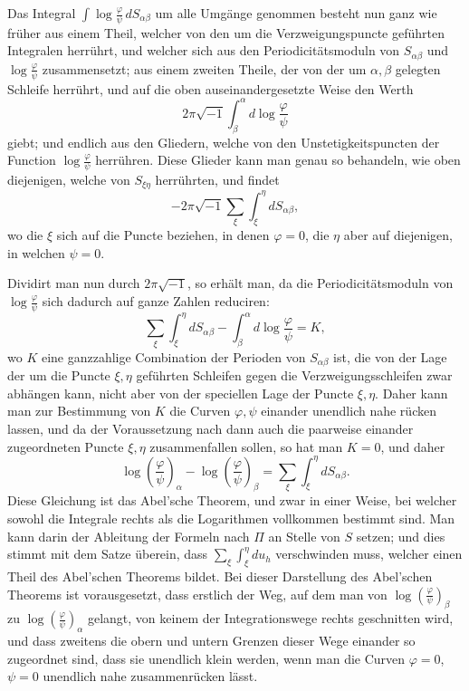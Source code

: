 \documentclass[10pt]{article}
\begin{document}
Das Integral \(\int\log\frac{\varphi}{\psi}\,dS_{\alpha\beta}\) um alle Umgänge genommen besteht nun ganz wie früher aus einem Theil, welcher von den um die Verzweigungspuncte geführten Integralen herrührt, und welcher sich aus den Periodicitätsmoduln von \(S_{\alpha\beta}\) und \(\log\frac{\varphi}{\psi}\) zusammensetzt; aus einem zweiten Theile, der von der um \(\alpha,\beta\) gelegten Schleife herrührt, und auf die oben auseinandergesetzte Weise den Werth
\[
2\pi\sqrt{-1}\int_{\beta}^{\alpha}d\log\frac{\varphi}{\psi}
\]
giebt; und endlich aus den Gliedern, welche von den Unstetigkeitspuncten der Function \(\log\frac{\varphi}{\psi}\) herrühren. Diese Glieder kann man genau so behandeln, wie oben diejenigen, welche von \(S_{\xi\eta}\) herrührten, und findet
\[
-2\pi\sqrt{-1}\sum_{\xi}\int_{\xi}^{\eta}dS_{\alpha\beta},
\]
wo die \(\xi\) sich auf die Puncte beziehen, in denen \(\varphi=0\), die \(\eta\) aber auf diejenigen, in welchen \(\psi=0\).

Dividirt man nun durch \(2\pi\sqrt{-1}\), so erhält man, da die Periodicitätsmoduln von \(\log\frac{\varphi}{\psi}\) sich dadurch auf ganze Zahlen reduciren:
\[
\sum_{\xi}\int_{\xi}^{\eta}dS_{\alpha\beta}-\int_{\beta}^{\alpha}d\log\frac{\varphi}{\psi}=K,
\]
wo \(K\) eine ganzzahlige Combination der Perioden von \(S_{\alpha\beta}\) ist, die von der Lage der um die Puncte \(\xi,\eta\) geführten Schleifen gegen die Verzweigungsschleifen zwar abhängen kann, nicht aber von der speciellen Lage der Puncte \(\xi,\eta\). Daher kann man zur Bestimmung von \(K\) die Curven \(\varphi,\psi\) einander unendlich nahe rücken lassen, und da der Voraussetzung nach dann auch die paarweise einander zugeordneten Puncte \(\xi,\eta\) zusammenfallen sollen, so hat man \(K=0\), und daher
\[
\log\left(\frac{\varphi}{\psi}\right)_\alpha-\log\left(\frac{\varphi}{\psi}\right)_\beta
=\sum_{\xi}\int_{\xi}^{\eta}dS_{\alpha\beta}.
\]
Diese Gleichung ist das Abel'sche Theorem, und zwar in einer Weise, bei welcher sowohl die Integrale rechts als die Logarithmen vollkommen bestimmt sind. Man kann darin der Ableitung der Formeln nach \(\Pi\) an Stelle von \(S\) setzen; und dies stimmt mit dem Satze überein, dass \(\sum_{\xi}\int_{\xi}^{\eta}du_h\) verschwinden muss, welcher einen Theil des Abel'schen Theorems bildet. Bei dieser Darstellung des Abel'schen Theorems ist vorausgesetzt, dass erstlich der Weg, auf dem man von \(\log(\frac{\varphi}{\psi})_\beta\) zu \(\log(\frac{\varphi}{\psi})_\alpha\) gelangt, von keinem der Integrationswege rechts geschnitten wird, und dass zweitens die obern und untern Grenzen dieser Wege einander so zugeordnet sind, dass sie unendlich klein werden, wenn man die Curven \(\varphi=0\), \(\psi=0\) unendlich nahe zusammenrücken lässt.
\end{document}

